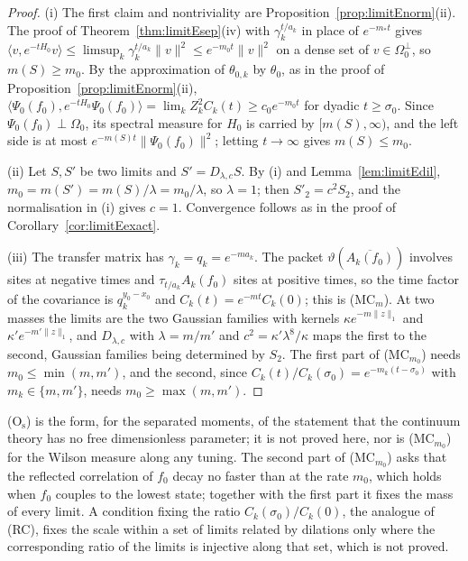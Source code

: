 \documentclass[aps,prd,twocolumn,superscriptaddress,nofootinbib,longbibliography,floatfix,amsmath,amssymb,10pt]{revtex4-2}
\theoremstyle{definition}
\theoremstyle{remark}
\newcommand{\ip}[2]{\langle #1,#2\rangle}
\begin{document}
\begin{proof}
(i) The first claim and nontriviality are
Proposition~\ref{prop:limitEnorm}(ii). The proof of
Theorem~\ref{thm:limitEsep}(iv) with $\gamma_k^{t/a_k}$ in place of
$e^{-m_*t}$ gives $\ip v{e^{-tH_0}v}\le\limsup_k\gamma_k^{t/a_k}\|v\|^2\le
e^{-m_0t}\|v\|^2$ on a dense set of $v\in\Omega_0^\perp$, so $m(S)\ge m_0$.
By the approximation of $\theta_{0,k}$ by $\theta_0$, as in the proof of
Proposition~\ref{prop:limitEnorm}(ii), $\ip{\Psi_0(f_0)}{e^{-tH_0}
\Psi_0(f_0)}=\lim_kZ_k^2C_k(t)\ge c_0e^{-m_0t}$ for dyadic $t\ge\sigma_0$.
Since $\Psi_0(f_0)\perp\Omega_0$, its spectral measure for $H_0$ is carried
by $[m(S),\infty)$, and the left side is at most $e^{-m(S)t}\|\Psi_0(f_0)
\|^2$; letting $t\to\infty$ gives $m(S)\le m_0$.

(ii) Let $S,S'$ be two limits and $S'=D_{\lambda,c}S$. By (i) and
Lemma~\ref{lem:limitEdil}, $m_0=m(S')=m(S)/\lambda=m_0/\lambda$, so
$\lambda=1$; then $S'_2=c^2S_2$, and the normalisation in (i) gives $c=1$.
Convergence follows as in the proof of Corollary~\ref{cor:limitEexact}.

(iii) The transfer matrix has $\gamma_k=q_k=e^{-ma_k}$. The packet
$\vartheta(\overline{A_k(f_0)})$ involves sites at negative times and
$\tau_{t/a_k}A_k(f_0)$ sites at positive times, so the time factor of the
covariance is $q_k^{y_0-x_0}$ and $C_k(t)=e^{-mt}C_k(0)$; this is
(MC$_m$). At two masses the limits are the two Gaussian families with
kernels $\kappa e^{-m\|z\|_1}$ and $\kappa'e^{-m'\|z\|_1}$, and
$D_{\lambda,c}$ with $\lambda=m/m'$ and $c^2=\kappa'\lambda^8/\kappa$ maps
the first to the second, Gaussian families being determined by $S_2$.
The first part of (MC$_{m_0}$) needs $m_0\le\min(m,m')$, and the second,
since $C_k(t)/C_k(\sigma_0)=e^{-m_k(t-\sigma_0)}$ with $m_k\in\{m,m'\}$,
needs $m_0\ge\max(m,m')$.
\end{proof}

(O$_{\mathrm s}$) is the form, for the separated moments, of the statement
that the continuum theory has no free dimensionless parameter; it is not
proved here, nor is (MC$_{m_0}$) for the Wilson measure along any tuning.
The second part of (MC$_{m_0}$) asks that the reflected correlation of
$f_0$ decay no faster than at the rate $m_0$, which holds when $f_0$
couples to the lowest state; together with the first part it fixes the
mass of every limit. A condition fixing the ratio $C_k(\sigma_0)/C_k(0)$,
the analogue of (RC), fixes the scale within a set of limits related by
dilations only where the corresponding ratio of the limits is injective
along that set, which is not proved.
\end{document}
